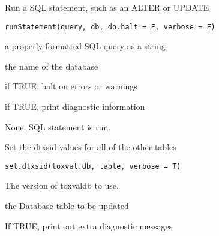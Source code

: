 \documentclass[letterpaper]{book}
\begin{document}
%
\begin{Description}\relax
Run a SQL statement, such as an ALTER or UPDATE
\end{Description}
%
\begin{Usage}
\begin{verbatim}
runStatement(query, db, do.halt = F, verbose = F)
\end{verbatim}
\end{Usage}
%
\begin{Arguments}
\begin{ldescription}
\item[\code{query}] a properly formatted SQL query as a string

\item[\code{db}] the name of the database

\item[\code{do.halt}] if TRUE, halt on errors or warnings

\item[\code{verbose}] if TRUE, print diagnostic information
\end{ldescription}
\end{Arguments}
%
\begin{Value}
None. SQL statement is run.
\end{Value}
%
\begin{Description}\relax
Set the dtxsid values for all of the other tables
\end{Description}
%
\begin{Usage}
\begin{verbatim}
set.dtxsid(toxval.db, table, verbose = T)
\end{verbatim}
\end{Usage}
%
\begin{Arguments}
\begin{ldescription}
\item[\code{toxval.db}] The version of toxvaldb to use.

\item[\code{table}] the Database table to be updated

\item[\code{verbose}] If TRUE, print out extra diagnostic messages
\end{ldescription}
\end{Arguments}
\end{document}
